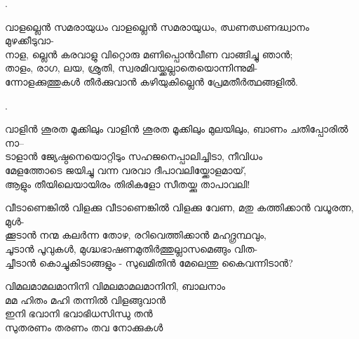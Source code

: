 \begin{enumerate}

.

\begin{slokam}{\VSv}{\VRV}{വാളല്ലെൻ സമരായുധം}
വാളല്ലെൻ സമരായുധം, ഝണഝണദ്ധ്വാനം മുഴക്കീടുവാ-\\
നാള, ല്ലെൻ കരവാളു വിറ്റൊരു മണിപ്പൊൻവീണ വാങ്ങിച്ചു ഞാൻ;\\
താളം, രാഗ, ലയ, ശ്രുതി, സ്വരമിവയ്ക്കല്ലാതെയൊന്നിന്നുമി-\\
ന്നോളക്കുത്തുകള്‍ തീർക്കുവാൻ കഴിയുകില്ലെൻ പ്രേമതീർത്ഥങ്ങളിൽ.
\end{slokam}



.

\begin{slokam}{\VSv}{\UN}{വാളിൻ ശൂരത മൂക്കിലും}
വാളിൻ ശൂരത മൂക്കിലും മുലയിലും, ബാണം ചതിപ്പോരിൽ നാ--\\
ടാളാൻ ജ്യേഷ്ഠനെയൊറ്റിടും സഹജനെപ്പാലിച്ചിടാ, നീവിധം\\
മേളത്തോടെ ജയിച്ചു വന്ന വരവാ ദീപാവലിയ്ക്കോളമായ്,\\
ആളും തീയിലെയായിരം തിരികളോ സീതയ്ക്കു താപാവലി!
\end{slokam}


\begin{slokam}{\VSv}{\DSN}{വീടാണെങ്കിൽ വിളക്കു}
വീടാണെങ്കിൽ വിളക്കു വേണ, മതു കത്തിക്കാൻ വധൂരത്ന, മുൾ-\\
ക്കൂടാൻ നന്മ കലർന്ന തോഴ, രറിവെത്തിക്കാൻ മഹദ്ഗ്രന്ഥവും,\\
ചൂടാൻ പൂവുകൾ, മുഗ്ദ്ധഭാഷണമുതിർത്തുല്ലാസമെങ്ങും വിത-\\
ച്ചീടാൻ കൊച്ചുകിടാങ്ങളും - സുഖമിതിൻ മേലെന്തു കൈവന്നിടാൻ?
\end{slokam}







\begin{slokam}{\VDv}{\VCBP}{വിമലമാമലമാനിനി}
വിമലമാമലമാനിനി, ബാലനാം\\
മമ ഹിതം മഹി തന്നിൽ വിളങ്ങുവാൻ\\
ഇനി ഭവാനി ഭവാഭിധസിന്ധു തൻ\\
സുതരണം തരണം തവ നോക്കുകള്‍
\end{slokam}


\end{enumerate}
